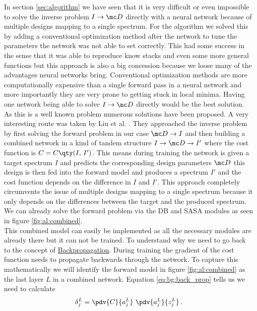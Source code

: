 
In section \ref{sec:algorithm} we have seen that it is very difficult or even impossible to solve the inverse problem $I \rightarrow \mc D$ directly with a neural network because of multiple designs mapping to a single spectrum. For the algorithm we solved this by adding a conventional optimization method after the network to tune the parameters the network was not able to set correctly. This had some success in the sense that it was able to reproduce know stacks and even some more general functions  but this approach is also a big concession because we loose many of the advantages neural networks bring. Conventional optimization methods are more computationally expensive than a single forward pass in a neural network and more importantly they are very prone to getting stuck in local minima. Having one network being able to solve $I \rightarrow \mc D$ directly would be the best solution.
\\

\indent As this is a well known problem numerous solutions have been proposed. A very interesting route was taken by Liu et al. \cite{Liu2018}. They approached the inverse problem by first solving the forward problem in our case $\mc D \rightarrow I$ and then building a combined network in a kind of tandem structure 
$I \rightarrow \mc D \rightarrow I'$
where the cost function is 
$C = C \qty(I, \, I')$.
This means during training the network is given a target spectrum $I$ and predicts the corresponding design parameters $\mc D$ this design is then fed into the forward model and produces a spectrum $I'$ and the cost function depends on the difference in $I$ and $I'$. This approach completely circumvents the issue of multiple designs mapping to a single spectrum because it only depends on the differences between the target and the produced spectrum. We can already solve the forward problem via the DB and SASA modules as seen in figure \ref{fig:al:combined}.
\\


\indent This combined model can easily be implemented as all the necessary modules are already there but it can not be trained. To understand why we need to go back to the concept of {\hyperref[eq:bg:back_prop]{Backpropagation}}.
During training the gradient of the cost function needs to propagate backwards through the network. To capture this mathematically we will identify the forward model in figure \ref{fig:al:combined} as the last layer $L$ in a combined network. Equation \eqref{eq:bg:back_prop} tells us we need to calculate
\begin{equation}
    \delta^L_j = \pdv{C}{a^L_j} \ \pdv{a^L_j}{z^L_j} \,.
\end{equation}

